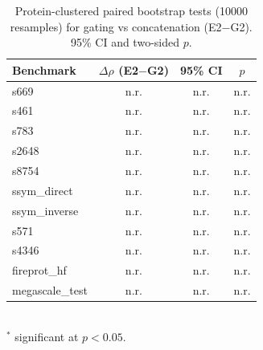 \begin{table}[t]\centering\small
\caption{Protein-clustered paired bootstrap tests (10000 resamples) for gating vs concatenation (E2$-$G2). 95\% CI and two-sided $p$.}
\label{tab:paired_tests}
\begin{tabular}{lccc}
\toprule
Benchmark & $\Delta\rho$ (E2$-$G2) & 95\% CI & $p$ \\
\midrule
s669 & n.r. & n.r. & n.r. \\
s461 & n.r. & n.r. & n.r. \\
s783 & n.r. & n.r. & n.r. \\
s2648 & n.r. & n.r. & n.r. \\
s8754 & n.r. & n.r. & n.r. \\
ssym_direct & n.r. & n.r. & n.r. \\
ssym_inverse & n.r. & n.r. & n.r. \\
s571 & n.r. & n.r. & n.r. \\
s4346 & n.r. & n.r. & n.r. \\
fireprot_hf & n.r. & n.r. & n.r. \\
megascale_test & n.r. & n.r. & n.r. \\
\bottomrule
\end{tabular}
\\[2pt]\footnotesize $^{*}$ significant at $p<0.05$.
\end{table}

